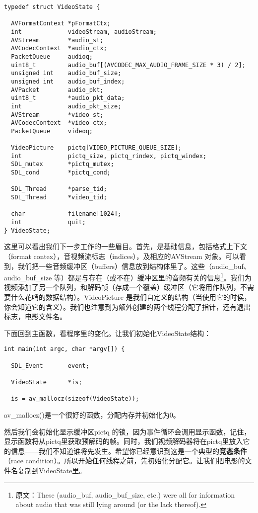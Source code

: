 \begin{lstlisting}
typedef struct VideoState {

  AVFormatContext *pFormatCtx;
  int             videoStream, audioStream;
  AVStream        *audio_st;
  AVCodecContext  *audio_ctx;
  PacketQueue     audioq;
  uint8_t         audio_buf[(AVCODEC_MAX_AUDIO_FRAME_SIZE * 3) / 2];
  unsigned int    audio_buf_size;
  unsigned int    audio_buf_index;
  AVPacket        audio_pkt;
  uint8_t         *audio_pkt_data;
  int             audio_pkt_size;
  AVStream        *video_st;
  AVCodecContext  *video_ctx;
  PacketQueue     videoq;

  VideoPicture    pictq[VIDEO_PICTURE_QUEUE_SIZE];
  int             pictq_size, pictq_rindex, pictq_windex;
  SDL_mutex       *pictq_mutex;
  SDL_cond        *pictq_cond;

  SDL_Thread      *parse_tid;
  SDL_Thread      *video_tid;

  char            filename[1024];
  int             quit;
} VideoState;
\end{lstlisting}

这里可以看出我们下一步工作的一些眉目。首先，是基础信息，包括格式上下文（format contex），音视频流标志（indices），及相应的AVStream 对象。可以看到，我们把一些音频缓冲区（buffers）信息放到结构体里了。这些（audio_buf、 audio_buf_size 等）都是与存在（或不在）缓冲区里的音频有关的信息\footnote{原文：These (audio_buf, audio_buf_size, etc.) were all for information about audio that was still lying around (or the lack thereof).}。我们为视频添加了另一个队列，和解码帧（存成一个覆盖）缓冲区（它将用作队列，不需要什么花哨的数据结构）。VideoPicture 是我们自定义的结构（当使用它的时侯，你会知道它的含义）。我们也注意到为额外创建的两个线程分配了指针，还有退出标志，电影文件名。

下面回到主函数，看程序里的变化。让我们初始化VideoState结构：

\begin{lstlisting}
int main(int argc, char *argv[]) {

  SDL_Event       event;

  VideoState      *is;

  is = av_mallocz(sizeof(VideoState));
  \end{lstlisting}

av_mallocz()是一个很好的函数，分配内存并初始化为0。

然后我们会初始化显示缓冲区pictq 的锁，因为事件循环会调用显示函数，记住，显示函数将从pictq里获取预解码的帧。同时，我们视频解码器将在pictq里放入它的信息——我们不知道谁将先发生。希望你已经意识到这是一个典型的\textbf{竞态条件}（race condition）。所以开始任何线程之前，先初始化分配它。让我们把电影的文件名复制到VideoState里。


